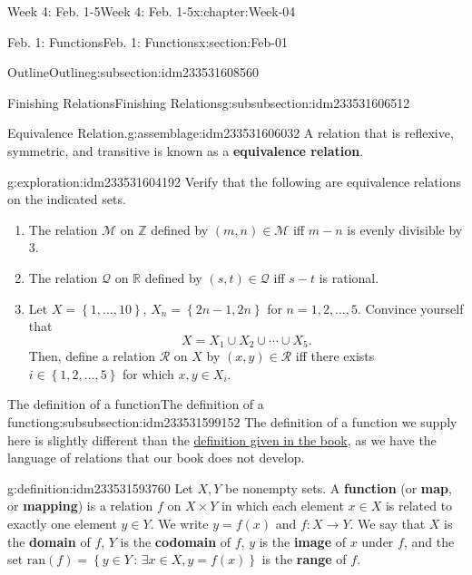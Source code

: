 \documentclass[oneside,10pt,]{book}
\newcommand{\terminology}[1]{\textbf{#1}}
\numberwithin{equation}{section}
\def\ran{\text{ran}}
\newcommand{\set}[1]{\left\{ {#1} \right\}}
\newcommand{\setof}[2]{{\left\{#1\,\colon\,#2\right\}}}
\def\Z{{\mathbb Z}}
\def\R{{\mathbb R}}
\newcommand{\Z}{\mathbb Z}
\newcommand{\R}{\mathbb R}
\begin{document}
\begin{chapterptx}{Week 4: Feb. 1-5}{}{Week 4: Feb. 1-5}{}{}{x:chapter:Week-04}
\begin{sectionptx}{Feb. 1: Functions}{}{Feb. 1: Functions}{}{}{x:section:Feb-01}
\begin{subsectionptx}{Outline}{}{Outline}{}{}{g:subsection:idm233531608560}
\begin{subsubsectionptx}{Finishing Relations}{}{Finishing Relations}{}{}{g:subsubsection:idm233531606512}
\begin{assemblage}{Equivalence Relation.}{g:assemblage:idm233531606032}%
A relation that is reflexive, symmetric, and transitive is known as a \terminology{equivalence relation}.%
\end{assemblage}
\begin{exploration}{}{g:exploration:idm233531604192}%
Verify that the following are equivalence relations on the indicated sets.%
%
\begin{enumerate}
\item{}The relation \(\mathcal{M}\) on \(\Z\) defined by \((m,n)\in \mathcal{M}\) iff \(m-n\) is evenly divisible by 3.%
\item{}The relation \(\mathcal{Q}\) on \(\R\) defined by \((s,t)\in \mathcal{Q}\) iff \(s-t\) is rational.%
\item{}Let \(X = \set{1,\ldots, 10}\), \(X_n = \set{2n-1,2n}\) for \(n=1,2,\ldots, 5\). Convince yourself that%
\begin{equation*}
X = X_1 \cup X_2 \cup \cdots \cup X_5.
\end{equation*}
Then, define a relation \(\mathcal{R}\) on \(X\) by \((x,y)\in \mathcal{R}\) iff there exists \(i\in \set{1,2,\ldots,5}\) for which \(x,y\in X_i\).%
\end{enumerate}
\end{exploration}%
\end{subsubsectionptx}
%
%
\typeout{************************************************}
\typeout{************************************************}
%
\begin{subsubsectionptx}{The definition of a function}{}{The definition of a function}{}{}{g:subsubsection:idm233531599152}
The definition of a function we supply here is slightly different than the \href{http://discrete.openmathbooks.org/dmoi3/sec_intro-functions.html\#sKa}{definition given in the book}, as we have the language of relations that our book does not develop.%
\begin{definition}{}{g:definition:idm233531593760}%
Let \(X,Y\) be nonempty sets. A \terminology{function} (or \terminology{map}, or \terminology{mapping}) is a relation \(f\) on \(X\times Y\) in which each element \(x\in X\) is related to exactly one element \(y\in Y\). We write \(y = f(x)\) and \(f : X\to Y\). We say that \(X\) is the \terminology{domain} of \(f\), \(Y\) is the \terminology{codomain} of \(f\), \(y\) is the \terminology{image} of \(x\) under \(f\), and the set \(\ran(f) = \setof{y\in Y}{\exists x\in X, y=f(x)}\) is the \terminology{range} of \(f\).%

\end{definition}
\end{subsubsectionptx}
\end{subsectionptx}
\end{sectionptx}
\end{chapterptx}
\end{document}
